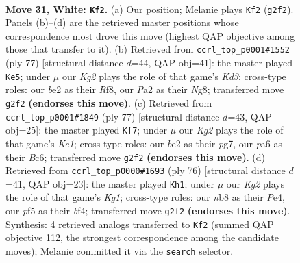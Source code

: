 \documentclass[11pt]{article}
\begin{document}
\clearpage

\begin{figure}[p]\centering
\begin{subfigure}{0.46\textwidth}\centering
\resizebox{\linewidth}{!}{%
\newchessgame
\chessboard[
  setfen={rn3k2/8/p7/3R1p1r/1P3P2/2B5/P3b1K1/R7 w - - 3 31},
  showmover=false,
  pgfstyle=straightmove, color=movearrow, markmove={g2-f2}
]}
\caption{}
\end{subfigure}\hfill
\begin{subfigure}{0.46\textwidth}\centering
\resizebox{\linewidth}{!}{%
\newchessgame
\chessboard[
  setfen={5rn1/p7/P2kr1p1/8/2R1P2P/8/6B1/4K2R b K - 2 39},
  showmover=false,
  pgfstyle=straightmove, color=movearrow, markmove={d6-e5}
]}
\caption{}
\end{subfigure}
\\[4pt]
\begin{subfigure}{0.46\textwidth}\centering
\resizebox{\linewidth}{!}{%
\newchessgame
\chessboard[
  setfen={4k3/1p4P1/2b1pB1r/5p2/8/P6P/2P4R/4K3 b - - 0 39},
  showmover=false,
  pgfstyle=straightmove, color=movearrow, markmove={e8-f7}
]}
\caption{}
\end{subfigure}\hfill
\begin{subfigure}{0.46\textwidth}\centering
\resizebox{\linewidth}{!}{%
\newchessgame
\chessboard[
  setfen={8/2p2k2/5r1p/R7/3pPbb1/3B4/6P1/5RK1 w - - 4 39},
  showmover=false,
  pgfstyle=straightmove, color=movearrow, markmove={g1-h1}
]}
\caption{}
\end{subfigure}
\caption{\textbf{Move 31, White: \texttt{Kf2}.} (a) Our position; Melanie plays \texttt{Kf2} (\texttt{g2f2}). Panels (b)--(d) are the retrieved master positions whose correspondence most drove this move (highest QAP objective among those that transfer to it). (b) Retrieved from \texttt{ccrl\_top\_p0001\#1552} (ply 77) [structural distance $d$=44, QAP obj=41]: the master played \texttt{Ke5}; under $\mu$ our \emph{Kg2} plays the role of that game's \emph{Kd3}; cross-type roles: our \emph{b}e2 as their \emph{R}f8, our \emph{P}a2 as their \emph{N}g8; transferred move \texttt{g2f2} \textbf{(endorses this move)}. (c) Retrieved from \texttt{ccrl\_top\_p0001\#1849} (ply 77) [structural distance $d$=43, QAP obj=25]: the master played \texttt{Kf7}; under $\mu$ our \emph{Kg2} plays the role of that game's \emph{Ke1}; cross-type roles: our \emph{b}e2 as their \emph{p}g7, our \emph{p}a6 as their \emph{B}c6; transferred move \texttt{g2f2} \textbf{(endorses this move)}. (d) Retrieved from \texttt{ccrl\_top\_p0000\#1693} (ply 76) [structural distance $d$=41, QAP obj=23]: the master played \texttt{Kh1}; under $\mu$ our \emph{Kg2} plays the role of that game's \emph{Kg1}; cross-type roles: our \emph{n}b8 as their \emph{P}e4, our \emph{p}f5 as their \emph{b}f4; transferred move \texttt{g2f2} \textbf{(endorses this move)}. Synthesis: 4 retrieved analogs transferred to \texttt{Kf2} (summed QAP objective 112, the strongest correspondence among the candidate moves); Melanie committed it via the \texttt{search} selector.}
\label{fig:thought-m60}
\end{figure}
\end{document}
